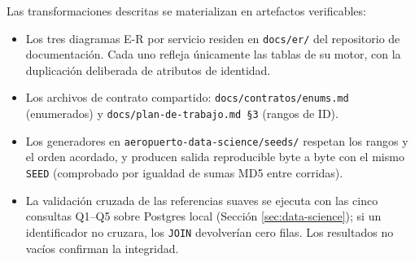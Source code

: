 Las transformaciones descritas se materializan en artefactos verificables:

\begin{itemize}
  \item Los tres diagramas E-R por servicio residen en \texttt{docs/er/}
    del repositorio de documentación. Cada uno refleja únicamente las
    tablas de su motor, con la duplicación deliberada de atributos de
    identidad.
  \item Los archivos de contrato compartido: \texttt{docs/contratos/enums.md}
    (enumerados) y \texttt{docs/plan-de-trabajo.md \S3} (rangos de ID).
  \item Los generadores en \texttt{aeropuerto-data-science/seeds/}
    respetan los rangos y el orden acordado, y producen salida
    reproducible byte a byte con el mismo \texttt{SEED} (comprobado por
    igualdad de sumas MD5 entre corridas).
  \item La validación cruzada de las referencias suaves se ejecuta con
    las cinco consultas Q1--Q5 sobre Postgres local (Sección
    \ref{sec:data-science}); si un identificador no cruzara, los
    \texttt{JOIN} devolverían cero filas. Los resultados no vacíos
    confirman la integridad.
\end{itemize}

